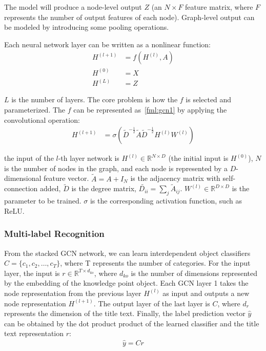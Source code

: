 The model will produce a node-level output \(Z\) (an \(N\times F\) feature matrix, where \(F\) represents the number of output features of each node). Graph-level output can be modeled by introducing some pooling operations.

Each neural network layer can be written as a nonlinear function:
\begin{align}
	H^{(l+1)} & =f(H^{(l)}, A) \\
	H^{(0)}   & =X             \\
	H^{(L)}   & =Z
\end{align}

\(L\) is the number of layers. The core problem is how the \(f\) is selected and parameterized. The \(f\) can be represented as~\ref{fml:gcn1} by applying the convolutional operation\cite{kipf2016semi}:
\begin{align}
	H^{(l+1)} & =\sigma(\tilde{D}^{-\frac{1}{2}} \tilde{A} \tilde{D}^{-\frac{1}{2}} H^{(l)} W^{(l)})\label{fml:gcn1}
\end{align}

the input of the \(l\)-th layer network is \(H^{(l)}\in \mathbb{R}^{N\times D}\) (the initial input is \(H^{(0)}\)), \(N\) is the number of nodes in the graph, and each node is represented by a \(D\)-dimensional feature vector. \(\tilde{A}=A+I_N\) is the adjacency matrix with self-connection added, \(\tilde{D}\) is the degree matrix, \(\tilde{D_{ii}}=\sum_{j}{\tilde{A}_{ij}}\). \(W^{(l)}\in \mathbb{R}^{D\times D}\) is the parameter to be trained. \(\sigma \) is the corresponding activation function, such as ReLU\@.

\subsubsection{Multi-label Recognition}
From the stacked GCN network, we can learn interdependent object classifiers \(C=\{c_1,c_2,\ldots,c_T\} \), where T represents the number of categories. For the input layer, the input is \(r\in \mathbb{R}^{T \times d_{ko}}\), where \(d_{ko}\) is the number of dimensions represented by the embedding of the knowledge point object. Each GCN layer 1 takes the node representation from the previous layer \(H^{(l)}\) as input and outputs a new node representation \(H^{(l+1)}\). The output layer of the last layer is \(C\), where \(d_r\) represents the dimension of the title text. Finally, the label prediction vector \(\hat{y}\) can be obtained by the dot product product of the learned classifier and the title text representation \(r\):
\begin{align}
	\hat{y} = C r
\end{align}

